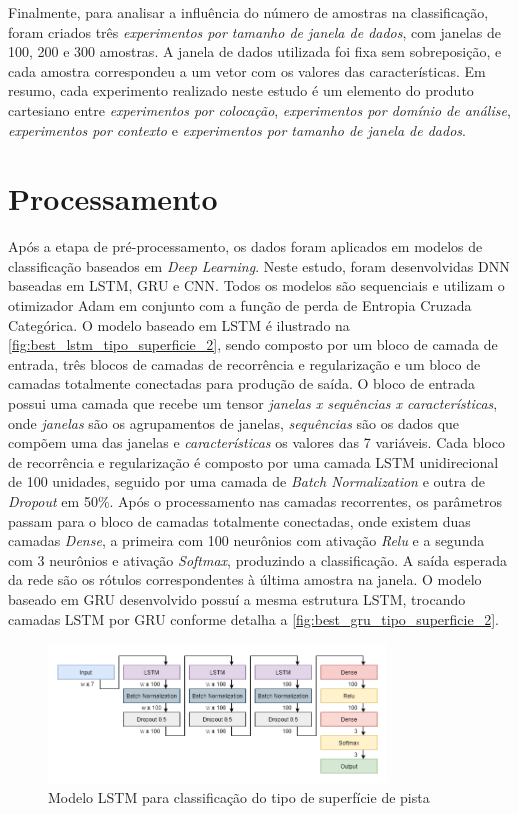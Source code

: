 Finalmente, para analisar a influência do número de amostras na classificação, foram criados três \emph{experimentos por tamanho de janela de dados}, com janelas de 100, 200 e 300 amostras. A janela de dados utilizada foi fixa sem sobreposição, e cada amostra correspondeu a um vetor com os valores das características. Em resumo, cada experimento realizado neste estudo é um elemento do produto cartesiano entre \emph{experimentos por colocação}, \emph{experimentos por domínio de análise}, \emph{experimentos por contexto} e \emph{experimentos por tamanho de janela de dados}.

\section{Processamento}

Após a etapa de pré-processamento, os dados foram aplicados em modelos de classificação baseados em \textit{Deep Learning}. Neste estudo, foram desenvolvidas DNN baseadas em LSTM, GRU e CNN. Todos os modelos são sequenciais e utilizam o otimizador Adam em conjunto com a função de perda de Entropia Cruzada Categórica. O modelo baseado em LSTM é ilustrado na \autoref{fig:best_lstm_tipo_superficie_2}, sendo composto por um bloco de camada de entrada, três blocos de camadas de recorrência e regularização e um bloco de camadas totalmente conectadas para produção de saída. O bloco de entrada possui uma camada que recebe um tensor \emph{janelas x sequências x características}, onde \emph{janelas} são os agrupamentos de janelas, \emph{sequências} são os dados que compõem uma das janelas e \emph{características} os valores das 7 variáveis. Cada bloco de recorrência e regularização é composto por uma camada LSTM unidirecional de 100 unidades, seguido por uma camada de \textit{Batch Normalization} e outra de \textit{Dropout} em 50\%. Após o processamento nas camadas recorrentes, os parâmetros passam para o bloco de camadas totalmente conectadas, onde existem duas camadas \textit{Dense}, a primeira com 100 neurônios com ativação \textit{Relu} e a segunda com 3 neurônios e ativação \textit{Softmax}, produzindo a classificação. A saída esperada da rede são os rótulos correspondentes à última amostra na janela. O modelo baseado em GRU desenvolvido possuí a mesma estrutura LSTM, trocando camadas LSTM por GRU conforme detalha a \autoref{fig:best_gru_tipo_superficie_2}.

\begin{figure}[h!]
  \centering
  \caption{Modelo LSTM para classificação do tipo de superfície de pista}
  \label{fig:best_lstm_tipo_superficie_2}
  \includegraphics[width=0.8\textwidth]{figuras/fig_37.png}
\end{figure}

